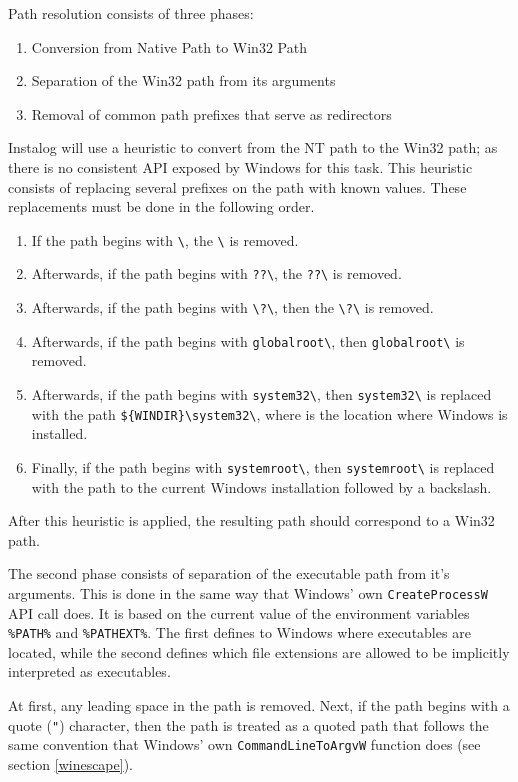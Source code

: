 Path resolution consists of three phases:
\begin{enumerate}
    \item Conversion from Native Path to Win32 Path
    \item Separation of the Win32 path from its arguments
    \item Removal of common path prefixes that serve as redirectors
\end{enumerate}

Instalog will use a heuristic to convert from the NT path to the Win32 path; as
there is no consistent API exposed by Windows for this task. This heuristic
consists of replacing several prefixes on the path with known values. These
replacements must be done in the following order.
\begin{enumerate}
    \item If the path begins with \verb|\|, the \verb|\| is removed.
    \item Afterwards, if the path begins with \verb|??\|, the \verb|??\| is
    removed.
    \item Afterwards, if the path begins with \verb|\?\|, then the \verb|\?\| is
    removed.
    \item Afterwards, if the path begins with \verb|globalroot\|, then
    \verb|globalroot\| is removed.
    \item Afterwards, if the path begins with \verb|system32\|, then
    \verb|system32\| is replaced with the path \verb|${WINDIR}\system32\|, where
     is the location where Windows is installed.
    \item Finally, if the path begins with \verb|systemroot\|, then
    \verb|systemroot\| is replaced with the path to the current Windows
    installation followed by a backslash.
\end{enumerate}

After this heuristic is applied, the resulting path should correspond to a Win32
path.

The second phase consists of separation of the executable path from it's
arguments. This is done in the same way that Windows' own \verb|CreateProcessW|
API call does. It is based on the current value of the environment variables
\verb|%PATH%| and \verb|%PATHEXT%|. The first defines to Windows where
executables are located, while the second defines which file extensions are
allowed to be implicitly interpreted as executables.

At first, any leading space in the path is removed. Next, if the path begins
with a quote (\verb|"|) character, then the path is treated as a quoted path
that follows the same convention that Windows' own \verb|CommandLineToArgvW|
function does (see section \ref{winescape}).

